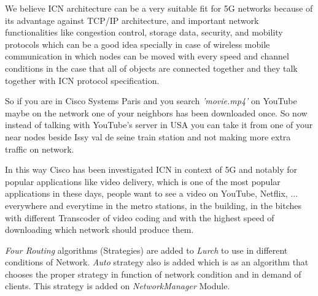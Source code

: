  We believe ICN architecture can be a very suitable fit for 5G networks because of its advantage against TCP/IP architecture, and important network functionalities like congestion control, storage data, security, and mobility protocols which can be a good idea specially in case of wireless mobile communication in which nodes can be moved with every speed and channel conditions in the case that all of objects are connected together and they talk together with ICN protocol specification.

So if you are in Cisco Systems Paris and you search \textit{'movie.mp4'} on YouTube maybe on the network one of your neighbors has been downloaded once. So now instead of talking with YouTube's server in USA you can take it from one of your near nodes beside Issy val de seine train station and not making more extra traffic on network.


In this way Cisco has been investigated ICN in context of 5G and notably for popular applications like video delivery, which is one of the most popular applications in these days, people want to see a video on YouTube, Netflix, ... everywhere and everytime in the metro stations, in the building, in the bitches with different Transcoder of video coding and with the highest speed of downloading which network should produce them.

\textit{Four Routing} algorithms (Strategies) are added to \textit{Lurch} to use in different conditions of Network. \textit{Auto} strategy also is added which is as an algorithm that chooses the proper strategy in function of network condition and in demand of clients. This strategy is added on \textit{NetworkManager} Module.








